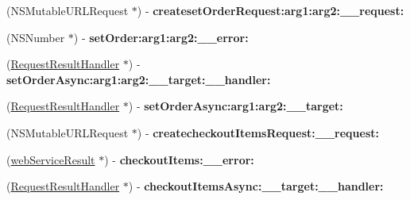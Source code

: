 \begin{DoxyCompactItemize}
\item 
\hypertarget{interface_supply_chain_service_port_binding_aaab2281025cb3447446a01758f209e92}{}(N\+S\+Mutable\+U\+R\+L\+Request $\ast$) -\/ {\bfseries createset\+Order\+Request\+:arg1\+:arg2\+:\+\_\+\+\_\+request\+:}\label{interface_supply_chain_service_port_binding_aaab2281025cb3447446a01758f209e92}

\item 
\hypertarget{interface_supply_chain_service_port_binding_a58c46f754ecef6d2f04563c27890994e}{}(N\+S\+Number $\ast$) -\/ {\bfseries set\+Order\+:arg1\+:arg2\+:\+\_\+\+\_\+error\+:}\label{interface_supply_chain_service_port_binding_a58c46f754ecef6d2f04563c27890994e}

\item 
\hypertarget{interface_supply_chain_service_port_binding_a99e5e428c01b7739e7da47acc8c141f4}{}(\hyperlink{interface_request_result_handler}{Request\+Result\+Handler} $\ast$) -\/ {\bfseries set\+Order\+Async\+:arg1\+:arg2\+:\+\_\+\+\_\+target\+:\+\_\+\+\_\+handler\+:}\label{interface_supply_chain_service_port_binding_a99e5e428c01b7739e7da47acc8c141f4}

\item 
\hypertarget{interface_supply_chain_service_port_binding_a471e5faa618009b4c434cda6cab70124}{}(\hyperlink{interface_request_result_handler}{Request\+Result\+Handler} $\ast$) -\/ {\bfseries set\+Order\+Async\+:arg1\+:arg2\+:\+\_\+\+\_\+target\+:}\label{interface_supply_chain_service_port_binding_a471e5faa618009b4c434cda6cab70124}

\item 
\hypertarget{interface_supply_chain_service_port_binding_a9a20dcbb6455b1d4020a1091ecb56f92}{}(N\+S\+Mutable\+U\+R\+L\+Request $\ast$) -\/ {\bfseries createcheckout\+Items\+Request\+:\+\_\+\+\_\+request\+:}\label{interface_supply_chain_service_port_binding_a9a20dcbb6455b1d4020a1091ecb56f92}

\item 
\hypertarget{interface_supply_chain_service_port_binding_a53bd564b437e1a561dbc3becf84493c0}{}(\hyperlink{interfaceweb_service_result}{web\+Service\+Result} $\ast$) -\/ {\bfseries checkout\+Items\+:\+\_\+\+\_\+error\+:}\label{interface_supply_chain_service_port_binding_a53bd564b437e1a561dbc3becf84493c0}

\item 
\hypertarget{interface_supply_chain_service_port_binding_aad617294dc16f8972dbabe86f1549b56}{}(\hyperlink{interface_request_result_handler}{Request\+Result\+Handler} $\ast$) -\/ {\bfseries checkout\+Items\+Async\+:\+\_\+\+\_\+target\+:\+\_\+\+\_\+handler\+:}\label{interface_supply_chain_service_port_binding_aad617294dc16f8972dbabe86f1549b56}


\end{DoxyCompactItemize}
